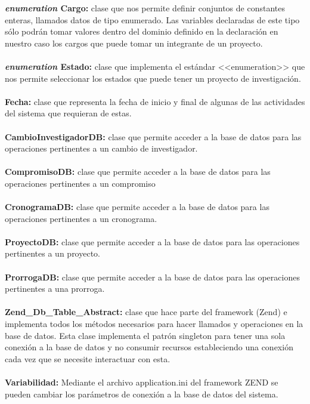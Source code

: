\documentclass[12pt,oneside,letterpaper]{report}
\begin{document}
\textbf{\textit{enumeration} Cargo:} clase que nos permite definir conjuntos de constantes enteras, llamados datos de tipo enumerado. Las variables declaradas de este tipo sólo podrán tomar valores dentro del dominio definido en la declaración en nuestro caso los cargos que puede tomar un integrante de un proyecto.\\
\\
\textbf{\textit{enumeration} Estado:} clase que implementa el estándar <<enumeration>> que nos permite seleccionar los estados que puede tener un proyecto de investigación.\\
\\
\textbf{Fecha:} clase que representa la fecha de inicio y final de algunas de las actividades del sistema que requieran de estas.\\
\\
\textbf{CambioInvestigadorDB:} clase que permite acceder a la base de datos para las operaciones pertinentes a un cambio de investigador.\\
\\
\textbf{CompromisoDB:} clase que permite acceder a la base de datos para las operaciones pertinentes a un compromiso\\
\\
\textbf{CronogramaDB:} clase que permite acceder a la base de datos para las operaciones pertinentes a un cronograma.\\
\\
\textbf{ProyectoDB:} clase que permite acceder a la base de datos para las operaciones pertinentes a un proyecto.\\
\\
\textbf{ProrrogaDB:} clase que permite acceder a la base de datos para las operaciones pertinentes a una prorroga.\\
\\
\textbf{Zend\_Db\_Table\_Abstract:} clase que hace parte del framework (Zend) e implementa todos los métodos necesarios para hacer llamados y operaciones en la base de datos. Esta clase implementa el patrón singleton para tener una sola conexión a la base de datos y no consumir recursos estableciendo una conexión cada vez que se necesite interactuar con esta.\\
\\

\textbf{Variabilidad:}
Mediante el archivo application.ini del framework ZEND se pueden cambiar los parámetros de conexión a la base de datos del sistema.\\
\end{document}
